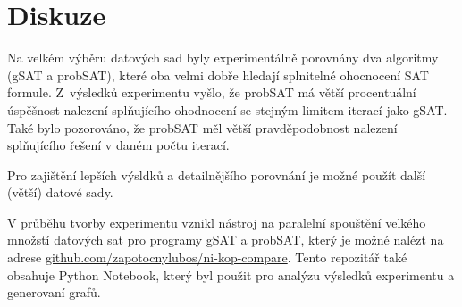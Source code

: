 \documentclass[twoside,twocolumn]{article}
\begin{document}


    \section{Diskuze}

    Na velkém výběru datových sad byly experimentálně porovnány dva algoritmy (gSAT a probSAT), které oba velmi dobře
    hledají splnitelné ohocnocení SAT formule.
    Z~výsledků experimentu vyšlo, že probSAT má větší procentuální úspěšnost nalezení splňujícího ohodnocení se stejným limitem iterací jako gSAT\@.
    Také bylo pozorováno, že probSAT měl větší pravděpodobnost nalezení splňujícího řešení v daném počtu iterací.

    Pro zajištění lepších výsldků a detailnějšího porovnání je možné použít další (větší) datové sady.
    
    V průběhu tvorby experimentu vznikl nástroj na paralelní spouštění velkého množstí datových sat pro programy gSAT a probSAT,
    který je možné nalézt na adrese \href{https://github.com/zapotocnylubos/ni-kop-compare}{github.com/zapotocnylubos/ni-kop-compare}.
    Tento repozitář také obsahuje Python Notebook, který byl použit pro analýzu výsledků experimentu a generovaní grafů.



    \clearpage

    
    

%
%

\end{document}
